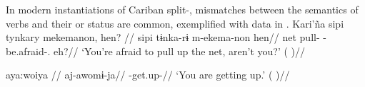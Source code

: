 %
%
%
%


In modern instantiations of Cariban split-, mismatches between the semantics of verbs and their  or  status are common, exemplified with \kalina data in .
%
%
%
\pex Kari'ña    \a \label{kar2}
\begingl \glpreamble sipi tynkary mekemanon, hen? //
\gla sipi tɨnka-rɨ m-ekema-non hen//
\glb net pull- -be.afraid-. eh?//
\glft ‘You're afraid to pull up the net, aren't you?’ (\cite[253]{courtz2008carib}
)//
\endgl

\a \label{kar2}
\begingl \glpreamble aya:woiya //
\gla aj-awomɨ-ja//
\glb {}-get.up-//
\glft ‘You are getting up.’ (\cite[167]{hoff1968carib}
)//
\endgl

